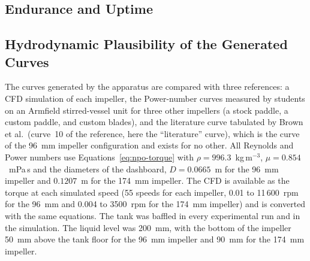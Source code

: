 \subsection{Endurance and Uptime}
\label{subsec:agit-endurance}


\subsection{Hydrodynamic Plausibility of the Generated Curves}
\label{subsec:agit-plausibility}

The curves generated by the apparatus are compared with three references: a CFD simulation of each impeller, the Power-number curves measured by students on an Armfield stirred-vessel unit for three other impellers (a stock paddle, a custom paddle, and custom blades), and the literature curve tabulated by Brown et al.\ (curve~10 of the reference, here the ``literature'' curve), which is the curve of the 96~mm impeller configuration and exists for no other. %
All Reynolds and Power numbers use Equations~\ref{eq:npo-torque} with $\rho = 996.3$~kg\,m$^{-3}$, $\mu = 0.854$~mPa\,s and the diameters of the dashboard, $D = 0.0665$~m for the 96~mm impeller and $0.1207$~m for the 174~mm impeller. The CFD is available as the torque at each simulated speed (55 speeds for each impeller, 0.01 to 11\,600~rpm for the 96~mm and 0.004 to 3500~rpm for the 174~mm impeller) and is converted with the same equations. The tank was baffled in every experimental run and in the simulation. The liquid level was 200~mm, with the bottom of the impeller 50~mm above the tank floor for the 96~mm impeller and 90~mm for the 174~mm impeller.

